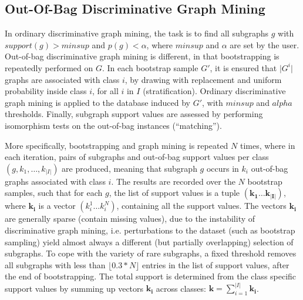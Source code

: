 \documentclass{sig-alternate}
\begin{document}
\subsection{Out-Of-Bag Discriminative Graph Mining}
\label{ss:oob-dgm}
In ordinary discriminative graph mining, the task is to find all subgraphs
$g$ with $support(g)>minsup$ and $p(g)<\alpha$, where $minsup$ and $\alpha$ are
set by the user.
Out-of-bag discriminative graph mining is different, in that bootstrapping is repeatedly performed on $G$.
In each bootstrap sample $G'$, it is ensured that $\vert G^i\vert$ graphs are associated with
class $i$, by drawing with replacement and uniform probability inside 
class $i$, for all $i$ in $I$ (stratification).  
Ordinary discriminative graph mining is applied to the database induced by $G'$, with $minsup$ and $alpha$ thresholds. 
Finally, subgraph support values are assessed by performing isomorphism
tests on the out-of-bag instances (``matching'').

More specifically, bootstrapping and graph mining is repeated $N$ times, where in each
iteration, pairs of subgraphs and out-of-bag support values per class
$(g,k_1,\ldots,k_{\vert I\vert})$ are produced, meaning that subgraph $g$
occurs in $k_i$ out-of-bag graphs associated with class $i$. The results are
recorded over the $N$ bootstrap samples, such that for each $g$, the list of
support values is a tuple $(\mathbf{k_1}\ldots\mathbf{k_{\vert I\vert}})$,
where $\mathbf{k_i}$ is a vector $(k_i^1\ldots k_i^N)$, containing all the
support values.  
The vectors $\mathbf{k_i}$
are generally sparse (contain missing values), due to the instability of discriminative graph mining,
i.e. perturbations to the dataset (such as bootstrap sampling) yield almost
always a different (but partially overlapping) selection of subgraphs. To cope with the
variety of rare subgraphs, a fixed threshold removes all subgraphs with less
than $\lfloor0.3*N\rfloor$ entries in the list of support values, after the end
of bootstrapping.
The total support is determined from the class specific support values by
summing up vectors $\mathbf{k_i}$ across classes:
$\mathbf{k}=\sum_{i=1}^{\vert I\vert} \mathbf{k_i}$. 
\end{document}
